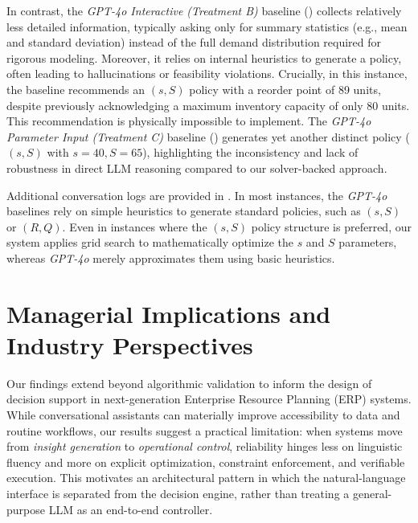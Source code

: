 \documentclass[mnsc,nonblindrev]{informs3_hide}
\begin{document}
In contrast, the \textit{GPT-4o Interactive (Treatment B)} baseline () collects relatively less detailed information, typically asking only for summary statistics (e.g., mean and standard deviation) instead of the full demand distribution required for rigorous modeling. Moreover, it relies on internal heuristics to generate a policy, often leading to hallucinations or feasibility violations. Crucially, in this instance, the baseline recommends an $(s, S)$ policy with a reorder point of 89 units, despite previously acknowledging a maximum inventory capacity of only 80 units. This recommendation is physically impossible to implement. The \textit{GPT-4o Parameter Input (Treatment C)} baseline () generates yet another distinct policy ($(s, S)$ with $s=40, S=65$), highlighting the inconsistency and lack of robustness in direct LLM reasoning compared to our solver-backed approach.


Additional conversation logs are provided in . In most instances, the \textit{GPT-4o} baselines rely on simple heuristics to generate standard policies, such as $(s, S)$ or $(R, Q)$. Even in instances where the $(s, S)$ policy structure is preferred, our system applies grid search to mathematically optimize the $s$ and $S$ parameters, whereas \emph{GPT-4o} merely approximates them using basic heuristics.

















    




\section{Managerial Implications and Industry Perspectives}
\label{sec:implications}

Our findings extend beyond algorithmic validation to inform the design of decision support in next-generation Enterprise Resource Planning (ERP) systems. While conversational assistants can materially improve accessibility to data and routine workflows, our results suggest a practical limitation: when systems move from \emph{insight generation} to \emph{operational control}, reliability hinges less on linguistic fluency and more on explicit optimization, constraint enforcement, and verifiable execution. This motivates an architectural pattern in which the natural-language interface is separated from the decision engine, rather than treating a general-purpose LLM as an end-to-end controller.
\end{document}
